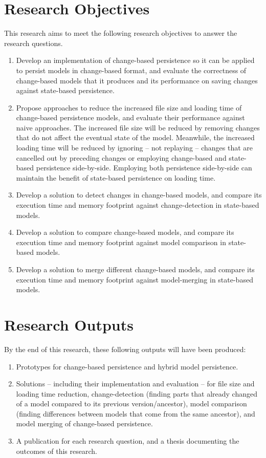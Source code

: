 \documentclass[12pt, a4paper]{report} \usepackage[titletoc]{appendix}
\begin{document}
\section{Research Objectives}
\label{sec:research_objectives}
This research aims to meet the following research objectives to answer the research questions.
\begin{enumerate}
	\item Develop an implementation of change-based persistence so it can be applied to persist models in change-based format, and evaluate the correctness of change-based models that it produces and its performance on saving changes against state-based persistence. 
	\item Propose approaches to reduce the increased file size and loading time of change-based persistence models, and evaluate their performance against naive approaches. The increased file size will be reduced by removing changes that do not affect the eventual state of the model. Meanwhile, the increased loading time will be reduced by ignoring -- not replaying -- changes that are cancelled out by preceding changes or employing change-based and state-based persistence side-by-side. Employing both persistence side-by-side can maintain the benefit of state-based persistence on loading time. 
    \item Develop a solution to detect changes in change-based models, and compare its execution time and memory footprint against change-detection in state-based models.
	\item Develop a solution to compare change-based models, and compare its execution time and memory footprint against model comparison in state-based models.
	\item Develop a solution to merge different change-based models, and compare its execution time and memory footprint against model-merging in state-based models. 
\end{enumerate}

\section{Research Outputs}
\label{sec:research_outputs}
By the end of this research, these following outputs will have been produced:
\begin{enumerate}
	\item Prototypes for change-based persistence and hybrid model persistence. 
	\item Solutions -- including their implementation and evaluation -- for file size and loading time reduction, change-detection (finding parts that already changed of a model compared to its previous version/ancestor), model comparison (finding differences between models that come from the same ancestor), and model merging of change-based persistence.
	\item A publication for each research question, and a thesis documenting the outcomes of this research.
\end{enumerate}
\end{document}
